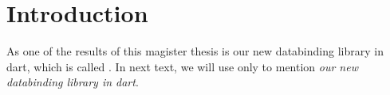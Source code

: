 \chapter*{Introduction}\label{chap:intro}

As one of the results of this magister thesis is our new databinding library in dart, 
which is called \tiles. 
In next  text, we will use only \tiles to mention \textit{our new databinding library in dart}.
